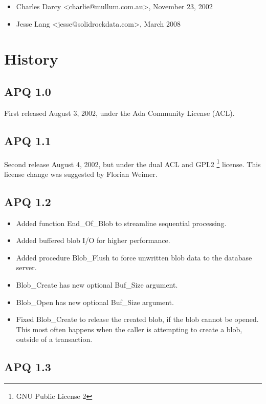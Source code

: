 \documentclass[english,letterpaper]{book}
\begin{document}
\begin{itemize}
\item Charles Darcy <charlie@mullum.com.au>, November 23, 2002
\item Jesse Lang <jesse@solidrockdata.com>, March 2008
\end{itemize}

\chapter{History}


\section*{APQ 1.0}

First released August 3, 2002, under the Ada Community License (ACL).


\section*{APQ 1.1}

Second release August 4, 2002, but under the dual ACL and GPL2%
\footnote{GNU Public License 2%
} license. This license change was suggested by Florian Weimer.


\section*{APQ 1.2}

\begin{itemize}
   \item Added function End\_Of\_Blob to streamline sequential processing.
   \item Added buffered blob I/O for higher performance.
   \item Added procedure Blob\_Flush to force unwritten blob data to the database
         server.
   \item Blob\_Create has new optional Buf\_Size argument.
   \item Blob\_Open has new optional Buf\_Size argument.
   \item Fixed Blob\_Create to release the created blob, if the blob cannot
         be opened. This most often happens when the caller is attempting to
         create a blob, outside of a transaction.
\end{itemize}

\section*{APQ 1.3}
\end{document}
